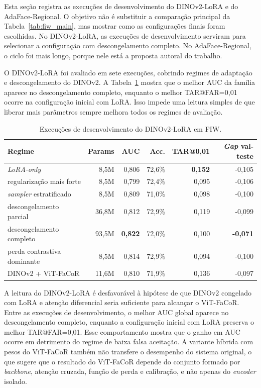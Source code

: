 Esta seção registra as execuções de desenvolvimento do DINOv2-LoRA e do AdaFace-Regional. O objetivo não é substituir a comparação principal da Tabela~\ref{tab:fiw_main}, mas mostrar como as configurações finais foram escolhidas. No DINOv2-LoRA, as execuções de desenvolvimento serviram para selecionar a configuração com descongelamento completo. No AdaFace-Regional, o ciclo foi mais longo, porque nele está a proposta autoral do trabalho.

O DINOv2-LoRA foi avaliado em sete execuções, cobrindo regimes de adaptação e descongelamento do DINOv2. A Tabela~\ref{tab:dinov2_lora_execucoes} mostra que o melhor AUC da família aparece no descongelamento completo, enquanto o melhor TAR@FAR=0{,}01 ocorre na configuração inicial com LoRA. Isso impede uma leitura simples de que liberar mais parâmetros sempre melhora todos os regimes de avaliação.

\begin{table}[htbp]
\centering
\scriptsize
\setlength{\tabcolsep}{3pt}
\caption{Execuções de desenvolvimento do DINOv2-LoRA em FIW.}
\label{tab:dinov2_lora_execucoes}
\begin{tabularx}{\textwidth}{Xrrrrr}
\hline
\textbf{Regime} & \textbf{Params} & \textbf{AUC} & \textbf{Acc.} & \textbf{TAR@0{,}01} & \textbf{\textit{Gap} val-teste} \\
\hline
\textit{LoRA-only}                     & 8{,}5M  & 0{,}806 & 72{,}6\% & \textbf{0{,}152} & -0{,}105 \\
regularização mais forte      & 8{,}5M  & 0{,}799 & 72{,}4\% & 0{,}095          & -0{,}106 \\
\textit{sampler} estratificado         & 8{,}5M  & 0{,}809 & 71{,}0\% & 0{,}098          & -0{,}100 \\
descongelamento parcial       & 36{,}8M & 0{,}812 & 72{,}9\% & 0{,}119          & -0{,}099 \\
descongelamento completo      & 93{,}5M & \textbf{0{,}822} & 72{,}0\% & 0{,}100 & \textbf{-0{,}071} \\
perda contrastiva dominante   & 8{,}5M  & 0{,}814 & 72{,}9\% & 0{,}094          & -0{,}100 \\
DINOv2 + ViT-FaCoR            & 11{,}6M & 0{,}810 & 71{,}9\% & 0{,}136          & -0{,}097 \\
\hline
\end{tabularx}
\end{table}

A leitura do DINOv2-LoRA é desfavorável à hipótese de que DINOv2 congelado com LoRA e atenção diferencial seria suficiente para alcançar o ViT-FaCoR. Entre as execuções de desenvolvimento, o melhor AUC global aparece no descongelamento completo, enquanto a configuração inicial com LoRA preserva o melhor TAR@FAR=0{,}01. Esse comportamento mostra que o ganho em AUC ocorre em detrimento do regime de baixa falsa aceitação. A variante híbrida com pesos do ViT-FaCoR também não transfere o desempenho do sistema original, o que sugere que o resultado do ViT-FaCoR depende do conjunto formado por \textit{backbone}, atenção cruzada, função de perda e calibração, e não apenas do \textit{encoder} isolado.

